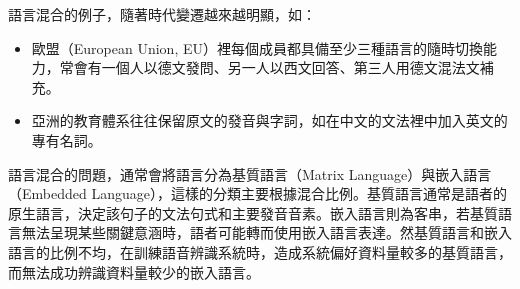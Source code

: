 語言混合的例子，隨著時代變遷越來越明顯，如：
\begin{itemize}
\itemsep -2pt
\item 歐盟（European Union, EU）裡每個成員都具備至少三種語言的隨時切換能力，常會有一個人以德文發問、另一人以西文回答、第三人用德文混法文補充。
\item 亞洲的教育體系往往保留原文的發音與字詞，如在中文的文法裡中加入英文的專有名詞。
\end{itemize}
語言混合的問題，通常會將語言分為基質語言（Matrix Language）與嵌入語言（Embedded Language），這樣的分類主要根據混合比例。基質語言通常是語者的原生語言，決定該句子的文法句式和主要發音音素。嵌入語言則為客串，若基質語言無法呈現某些關鍵意涵時，語者可能轉而使用嵌入語言表達。然基質語言和嵌入語言的比例不均，在訓練語音辨識系統時，造成系統偏好資料量較多的基質語言，而無法成功辨識資料量較少的嵌入語言。

